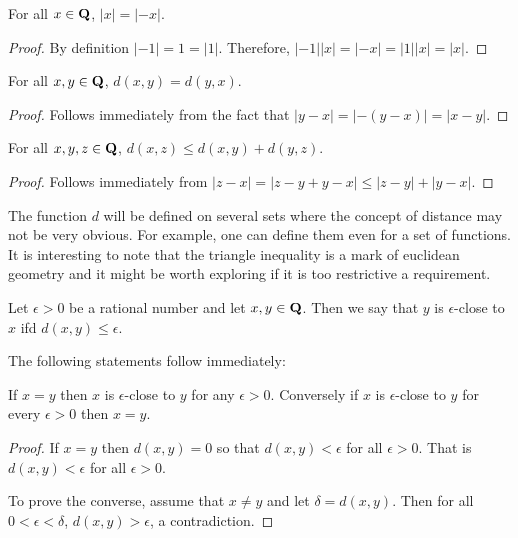 \begin{lem}\label{c3s3l8}
For all $x \in \mathbf{Q}$, $|x| = |-x|$.
\end{lem}
\begin{proof}
By definition $|-1| = 1 = |1|$. Therefore, $|-1||x| = |-x| = |1||x| = |x|$.
\end{proof}

\begin{lem}\label{c3s3l9}
For all $x, y \in \mathbf{Q}$, $d(x, y) = d(y, x)$.
\end{lem}
\begin{proof}
Follows immediately from the fact that $|y - x| = |-(y - x)| = |x - y|$.
\end{proof}

\begin{lem}\label{c3s3l10}
For all $x, y, z \in \mathbf{Q}$, $d(x, z) \le d(x, y) + d(y, z)$.
\end{lem}
\begin{proof}
Follows immediately from $|z - x| = |z - y + y - x| \le |z - y| + |y - x|$. 
\end{proof}

The function $d$ will be defined on several sets where the concept of 
distance may not be very obvious. For example, one can define them even
for a set of functions. It is interesting to note that the triangle 
inequality is a mark of euclidean geometry and it might be worth exploring
if it is too restrictive a requirement.

\begin{defn}\label{c3s3d3}
Let $\epsilon > 0$ be a rational number and let $x, y \in \mathbf{Q}$. Then we
say that $y$ is $\epsilon$-close to $x$ ifd $d(x, y) \le \epsilon$.
\end{defn}

The following statements follow immediately:
\begin{lem}\label{c3s3l11}
If $x = y$ then $x$ is $\epsilon$-close to $y$ for any $\epsilon > 0$.
Conversely if $x$ is $\epsilon$-close to $y$ for every $\epsilon > 0$
then $x = y$.
\end{lem}
\begin{proof}
If $x = y$ then $d(x, y) = 0$ so that $d(x, y) < \epsilon$ for all 
$\epsilon > 0$. That is $d(x, y) < \epsilon$ for all $\epsilon > 0$.

To prove the converse, assume that $x \ne y$ and let $\delta = d(x, y)$.
Then for all $0 < \epsilon < \delta$, $d(x, y) > \epsilon$, a 
contradiction.
\end{proof}

